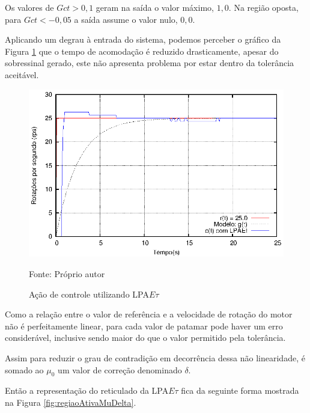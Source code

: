 Os valores de $Gct > 0,1$ geram na saída o valor máximo,
$1,0$. Na região oposta, para $Gct < -0,05$ a saída assume
 o valor nulo, $0,0$. 

Aplicando um degrau à entrada do sistema, 
podemos perceber o gráfico da 
Figura \ref{fig:acaoLPAEtgct100} 
que o tempo de acomodação é reduzido drasticamente, 
apesar do sobressinal gerado, 
este não apresenta problema por estar 
dentro da tolerância aceitável. 



\begin{figure}[!htb]%
\caption{Ação de controle utilizando LPA$E\tau$}
\vspace{-1cm}\center\includegraphics[scale=1.6]{./imagens/LPAEt-gct100.eps}
\label{fig:acaoLPAEtgct100}

{\small Fonte: Próprio autor}
\end{figure}





Como a relação entre o valor de referência e a 
velocidade de rotação do motor não é perfeitamente linear,
para cada valor de patamar pode haver um erro considerável,
inclusive sendo maior do que o valor permitido pela 
tolerância. 

Assim para reduzir o grau de contradição
em decorrência dessa não linearidade, 
é somado ao $\mu_0$ um valor de correção denominado $\delta$.

Então a representação do reticulado da LPA$E\tau$ 
fica da seguinte forma mostrada na 
Figura \ref{fig:regiaoAtivaMuDelta}. 





